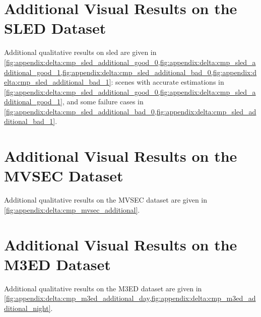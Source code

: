\section{Additional Visual Results on the SLED Dataset}\label{sec:appendix:delta:visual_results_sled}
Additional qualitative results on \acrshort{sled} are given in \cref{fig:appendix:delta:cmp_sled_additional_good_0,fig:appendix:delta:cmp_sled_additional_good_1,fig:appendix:delta:cmp_sled_additional_bad_0,fig:appendix:delta:cmp_sled_additional_bad_1}: scenes with accurate estimations in \cref{fig:appendix:delta:cmp_sled_additional_good_0,fig:appendix:delta:cmp_sled_additional_good_1}, and some failure cases in \cref{fig:appendix:delta:cmp_sled_additional_bad_0,fig:appendix:delta:cmp_sled_additional_bad_1}.


\section{Additional Visual Results on the MVSEC Dataset}\label{sec:appendix:delta:visual_results_mvsec}
Additional qualitative results on the MVSEC dataset are given in \cref{fig:appendix:delta:cmp_mvsec_additional}.


\section{Additional Visual Results on the M3ED Dataset}\label{sec:appendix:delta:visual_results_m3ed}
Additional qualitative results on the M3ED dataset are given in \cref{fig:appendix:delta:cmp_m3ed_additional_day,fig:appendix:delta:cmp_m3ed_additional_night}.


